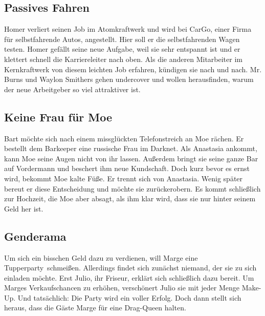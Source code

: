 
\subsection{Passives Fahren}
Homer verliert seinen Job im Atomkraftwerk und wird bei CarGo, einer Firma für selbstfahrende Autos, angestellt. Hier soll er die selbstfahrenden Wagen testen. Homer gefällt seine neue Aufgabe, weil sie sehr entspannt ist und er klettert schnell die Karriereleiter nach oben. Als die anderen Mitarbeiter im Kernkraftwerk von diesem leichten Job erfahren, kündigen sie nach und nach. Mr. Burns und Waylon Smithers gehen undercover und wollen herausfinden, warum der neue Arbeitgeber so viel attraktiver ist.


\subsection{Keine Frau für Moe}\label{XABF20}
Bart möchte sich nach einem missglückten Telefonstreich an Moe rächen. Er bestellt dem Barkeeper eine russische Frau im Darknet. Als Anastasia ankommt, kann Moe seine Augen nicht von ihr lassen. Außerdem bringt sie seine ganze Bar auf Vordermann und beschert ihm neue Kundschaft. Doch kurz bevor es ernst wird, bekommt Moe kalte Füße. Er trennt sich von Anastasia. Wenig später bereut er diese Entscheidung und möchte sie zurückerobern. Es kommt schließlich zur Hochzeit, die Moe aber absagt, als ihm klar wird, dass sie nur hinter seinem Geld her ist.


\subsection{Genderama}
Um sich ein bisschen Geld dazu zu verdienen, will Marge eine \glqq Tupperparty\grqq\ schmeißen. Allerdings findet sich zunächst niemand, der sie zu sich einladen möchte. Erst Julio, ihr Friseur, erklärt sich schließlich dazu bereit. Um Marges Verkaufschancen zu erhöhen, verschönert Julio sie mit jeder Menge Make-Up. Und tatsächlich: Die Party wird ein voller Erfolg. Doch dann stellt sich heraus, dass die Gäste Marge für eine Drag-Queen halten.


